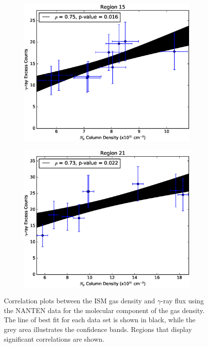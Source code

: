 \documentclass[12pt,a4paper]{article}
\begin{document}
\begin{appendices}
\begin{figure}[H]
\begin{subfigure}{0.5\textwidth}
		\includegraphics[width=0.9\linewidth, height=0.27\textheight]{gamma_nHI_reg15}
		\label{fig:gnHIreg15}
	\end{subfigure}
	\begin{subfigure}{0.5\textwidth}
		\centering
		\includegraphics[width=0.9\linewidth, height=0.27\textheight]{gamma_nHI_reg21}
		\label{fig:gnHIreg21}
	\end{subfigure}
	\caption{Correlation plots between the ISM gas density and $\gamma$-ray flux using the NANTEN data for the molecular component of the gas density. The line of best fit for each data set is shown in black, while the grey area illustrates the confidence bands. Regions that display significant correlations are shown.}
	\label{fig:regionalgasgammacornanten}
\end{figure}


\end{appendices}
\end{document}
